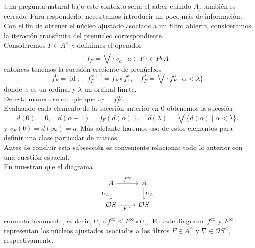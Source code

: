 \documentclass[12pt]{article}
\DeclareMathOperator{\id}{id}
\begin{document}
Una pregunta natural bajo este contexto sería el saber cuándo
$A_j$ también es cerrado. Para responderlo, necesitamos introducir un poco más de información.\\

Con el fin de obtener el núcleo ajustado asociado a un filtro abierto, consideramos la iteración transfinita del prenúcleo correspondiente.\\

Consideremos $F\in A^\wedge$ y definimos el operador
\begin{equation}\label{Prenucleo}
f_{F}=\dot{\bigvee}\{v_a\mid a\in F\}\in PrA
\end{equation}
entonces  tenemos la sucesión creciente de prenúcleos
\begin{equation}\label{Sucesionf}
f_F^0=\id,\quad f_F^{\alpha +1}=f_F\circ f_F^\alpha,\quad f_F^\lambda=\bigvee\{f_F^\alpha\mid \alpha<\lambda\}
\end{equation}
donde $\alpha$ es un ordinal y $\lambda$ un ordinal límite.\\

De esta manera se cumple que $v_F=f_F^\infty$.\\

Evaluando cada elemento de la sucesión anterior en $0$ obtenemos la sucesión
\begin{equation}\label{Sucesiond}
d(0)=0,\quad d(\alpha + 1)=f_F(d(\alpha)),\quad d(\lambda)=\bigvee\{d(\alpha)\mid \alpha<\lambda\}.
\end{equation}
y $v_F(0)=d(\infty)=d$. Más adelante haremos uso de estos elementos para definir una clase particular de marcos.\\

Antes de concluir esta subsección es conveniente relacionar todo lo anterior con una cuestión espacial.\\

En \cite[Lema 8.9 y Corolario 8.10]{simmons2004vietoris} muestran que el diagrama
\[\begin{tikzcd}
	A & A \\
	{\mathcal{O}S} & {\mathcal{O}S}
	\arrow["{f^\infty}", from=1-1, to=1-2]
	\arrow["{U_A}"', from=1-1, to=2-1]
	\arrow["{U_A}", from=1-2, to=2-2]
	\arrow["{F^\infty}"', from=2-1, to=2-2]
\end{tikzcd}\]
conmuta laxamente, es decir, $U_A\circ f^\infty\leq F^\infty \circ U_A$. En este diagrama $f^\infty$ y $F^\infty$ representan los
núcleos ajustados asociados a los filtros $F\in A^\wedge$ y $\nabla\in \mathcal{O}S^\wedge$, respectivamente.\\
\end{document}
